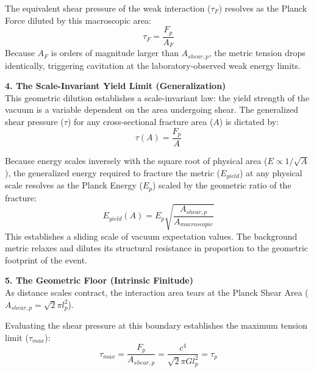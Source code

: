 The equivalent shear pressure of the weak interaction ($\tau_F$) resolves as the Planck Force diluted by this macroscopic area:
\begin{equation}
    \tau_F = \frac{F_p}{A_F} \label{eq:fermi_shear_pressure}
\end{equation}
Because $A_F$ is orders of magnitude larger than $A_{shear, p}$, the metric tension drops identically, triggering cavitation at the laboratory-observed weak energy limits. 

\vspace{0.2 cm}

\textbf{4. The Scale-Invariant Yield Limit (Generalization)}\\
This geometric dilution establishes a scale-invariant law: the yield strength of the vacuum is a variable dependent on the area undergoing shear. The generalized shear pressure ($\tau$) for any cross-sectional fracture area ($A$) is dictated by:
\begin{equation}
    \tau(A) = \frac{F_p}{A} \label{eq:generalized_shear_pressure}
\end{equation}

Because energy scales inversely with the square root of physical area ($E \propto 1/\sqrt{A}$), the generalized energy required to fracture the metric ($E_{yield}$) at any physical scale resolves as the Planck Energy ($E_p$) scaled by the geometric ratio of the fracture:
\begin{equation}
    E_{yield}(A) = E_p \sqrt{\frac{A_{shear, p}}{A_{macroscopic}}} \label{eq:generalized_yield_energy}
\end{equation}
This establishes a sliding scale of vacuum expectation values. The background metric relaxes and dilutes its structural resistance in proportion to the geometric footprint of the event.

\vspace{0.2 cm}


\textbf{5. The Geometric Floor (Intrinsic Finitude)}\\
As distance scales contract, the interaction area tears at the Planck Shear Area ($A_{shear, p} = \sqrt{2}\pi l_p^2$). 

Evaluating the shear pressure at this boundary establishes the maximum tension limit ($\tau_{max}$):
\begin{equation}
    \tau_{max} = \frac{F_p}{A_{shear, p}} = \frac{c^4}{\sqrt{2}\pi G l_p^2} = \tau_p \label{eq:geometric_floor_tau}
\end{equation}

